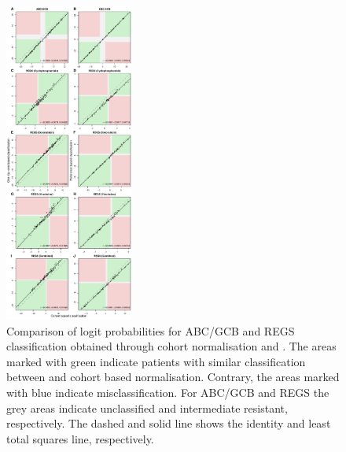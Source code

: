 \documentclass{article}
\begin{document}
\begin{figure}
\begin{center}
\includegraphics[width=0.375\textwidth]{figures/figure2.pdf}
\end{center}
\caption{Comparison of logit probabilities for ABC/GCB and REGS classification obtained through cohort normalisation and \hemaClass{}.
The areas marked with green indicate patients with similar classification between \hemaClass{} and cohort based normalisation.
Contrary, the areas marked with blue indicate misclassification.
For ABC/GCB and REGS the grey areas indicate unclassified and intermediate resistant, respectively.
The dashed and solid line shows the identity and least total squares line, respectively.}
\label{fig:ABCGCBDrug}
\end{figure}
\end{document}
